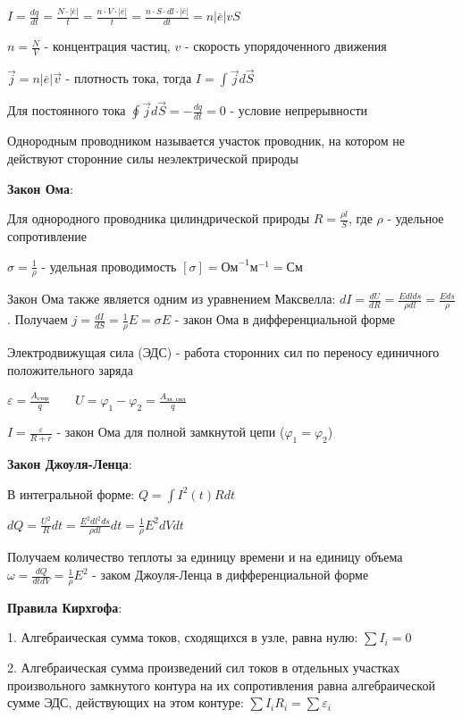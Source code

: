 \documentclass[12pt]{article}
\begin{document}
$I = \frac{dq}{dt} = \frac{N \cdot |\overline{e}|}{t} = \frac{n \cdot V \cdot |\overline{e}|}{t} = \frac{n \cdot S \cdot dl \cdot |\overline{e}|}{dt} = n |\overline{e}| v S$

$n = \frac{N}{V}$ - концентрация частиц, $v$ - скорость упорядоченного движения

$\vec{j} = n |\overline{e}| \vec{v}$ - плотность тока, тогда $I = \int \vec{j} d\vec{S}$

Для постоянного тока $\oint \vec{j} d\vec{S} = -\frac{dq}{dt} = 0$ - условие непрерывности

Однородным проводником называется участок проводник, на котором не действуют сторонние силы неэлектрической природы

\textbf{Закон Ома}: 

Для однородного проводника цилиндрической природы $R = \frac{\rho l}{S}$, где $\rho$ - удельное сопротивление

$\sigma = \frac{1}{\rho}$ - удельная проводимость \hfill $[\sigma] = \text{Ом}^{-1} \text{м}^{-1} = \text{См}$

Закон Ома также является одним из уравнением Максвелла: $dI = \frac{dU}{dR} = \frac{E dl ds}{\rho dl} = \frac{E ds}{\rho}$.
Получаем $j = \frac{dI}{dS} = \frac{1}{\rho} E = \sigma E$ - закон Ома в дифференциальной форме

Электродвижущая сила (ЭДС) - работа сторонних сил по переносу единичного положительного заряда

$\varepsilon = \frac{A_\text{стор}}{q} \qquad U = \varphi_1 - \varphi_2 = \frac{A_{\text{эл. сил}}}{q}$

$I = \frac{\varepsilon}{R + r}$ - закон Ома для полной замкнутой цепи ($\varphi_1 = \varphi_2$)

\textbf{Закон Джоуля-Ленца}: 

В интегральной форме: $Q = \int I^2(t) Rdt$

$dQ = \frac{U^2}{R} dt = \frac{E^2 dl^2 ds}{\rho dl} dt = \frac{1}{\rho} E^2 dV dt$

Получаем количество теплоты за единицу времени и на единицу объема $\omega = \frac{dQ}{dt dV} = \frac{1}{\rho} E^2$ - заком Джоуля-Ленца в дифференциальной форме

\textbf{Правила Кирхгофа}:

1. Алгебраическая сумма токов, сходящихся в узле, равна нулю: $\sum I_i = 0$

2. Алгебраическая сумма произведений сил токов в отдельных участках произвольного замкнутого контура на их сопротивления равна алгебраической сумме ЭДС, действующих на этом контуре: $\sum I_i R_i = \sum \varepsilon_i$
\end{document}
